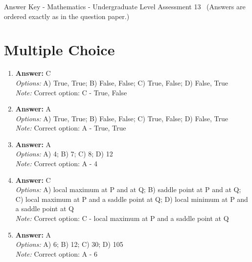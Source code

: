 \documentclass[12pt]{article}
\begin{document}
\begin{center}
Answer Key - Mathematics - Undergraduate Level Assessment 13 \
\small (Answers are ordered exactly as in the question paper.)
\end{center}

\section*{Multiple Choice}
\begin{enumerate}[label=\arabic*.]
\item \textbf{Answer:} C
\\ \textit{Options:} A) True, True; B) False, False; C) True, False; D) False, True
\\ \textit{Note:} Correct option: C - True, False
\item \textbf{Answer:} A
\\ \textit{Options:} A) True, True; B) False, False; C) True, False; D) False, True
\\ \textit{Note:} Correct option: A - True, True
\item \textbf{Answer:} A
\\ \textit{Options:} A) 4; B) 7; C) 8; D) 12
\\ \textit{Note:} Correct option: A - 4
\item \textbf{Answer:} C
\\ \textit{Options:} A) local maximum at P and at Q; B) saddle point at P and at Q; C) local maximum at P and a saddle point at Q; D) local minimum at P and a saddle point at Q
\\ \textit{Note:} Correct option: C - local maximum at P and a saddle point at Q
\item \textbf{Answer:} A
\\ \textit{Options:} A) 6; B) 12; C) 30; D) 105
\\ \textit{Note:} Correct option: A - 6
\end{enumerate}
\end{document}
